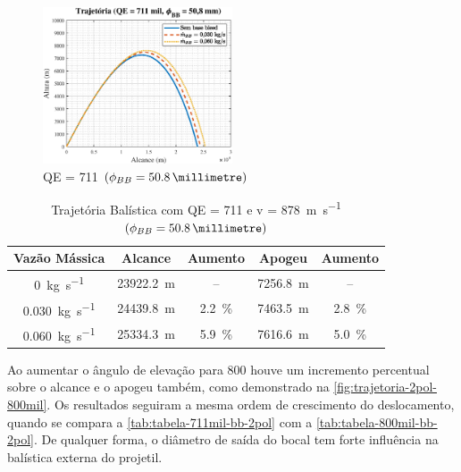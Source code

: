 \begin{figure}[!ht]
	\centering
    \includegraphics[width=0.5\textwidth]{foto3-qe711mil-2pol.eps}
    \caption[QE = \qty{711}{\milliradian} \(\left(\phi_{BB} = \qty{50,8}{\millimetre}\right)\)]{QE = \qty{711}{\milliradian} \(\left(\phi_{BB} = \qty{50,8}{\millimetre}\right)\)}
    \label{fig:trajetoria-2pol-711mil}
\end{figure}

\begin{table}[!ht]
\centering
\caption[Trajetória Balística com QE = \qty{711}{\milliradian} e v = \qty{878}{\metre\per\second} \(\left(\phi_{BB} = \qty{50,8}{\millimetre}\right)\)]{Trajetória Balística com QE = \qty{711}{\milliradian} e v = \qty{878}{\metre\per\second} \(\left(\phi_{BB} = \qty{50,8}{\millimetre}\right)\)}
\vspace{0.5cm}
\begin{tabular}{c|c|c|c|c}
Vazão Mássica & Alcance & Aumento & Apogeu & Aumento \\
\hline
\qty{0}{\kilogram\per\second} & \qty{23922,2}{\metre} & -- & \qty{7256,8}{\metre} & -- \\
\qty{0,030}{\kilogram\per\second} & \qty{24439,8}{\metre} & \qty{2,2}{\percent} & \qty{7463,5}{\metre} & \qty{2,8}{\percent} \\
\qty{0,060}{\kilogram\per\second} & \qty{25334,3}{\metre} & \qty{5,9}{\percent} & \qty{7616,6}{\metre} & \qty{5,0}{\percent}
\end{tabular}
\label{tab:tabela-711mil-bb-2pol}
\end{table}

Ao aumentar o ângulo de elevação para \qty{800}{\milliradian} houve um incremento percentual sobre o alcance e o apogeu também, como demonstrado na \autoref{fig:trajetoria-2pol-800mil}. Os resultados seguiram a mesma ordem de crescimento do deslocamento, quando se compara a \autoref{tab:tabela-711mil-bb-2pol} com a \autoref{tab:tabela-800mil-bb-2pol}. De qualquer forma, o diâmetro de saída do bocal tem forte influência na balística externa do projetil.

